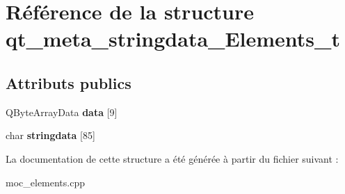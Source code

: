 \hypertarget{structqt__meta__stringdata__Elements__t}{\section{Référence de la structure qt\+\_\+meta\+\_\+stringdata\+\_\+\+Elements\+\_\+t}
\label{structqt__meta__stringdata__Elements__t}
}
\subsection*{Attributs publics}
\begin{DoxyCompactItemize}
\item 
\hypertarget{structqt__meta__stringdata__Elements__t_a9a53c432f6a13d562e493594fa17e253}{Q\+Byte\+Array\+Data {\bfseries data} \mbox{[}9\mbox{]}}\label{structqt__meta__stringdata__Elements__t_a9a53c432f6a13d562e493594fa17e253}

\item 
\hypertarget{structqt__meta__stringdata__Elements__t_aa349dfd3eee0891efb26dcc8ee13772a}{char {\bfseries stringdata} \mbox{[}85\mbox{]}}\label{structqt__meta__stringdata__Elements__t_aa349dfd3eee0891efb26dcc8ee13772a}

\end{DoxyCompactItemize}


La documentation de cette structure a été générée à partir du fichier suivant \+:\begin{DoxyCompactItemize}
\item 
moc\+\_\+elements.\+cpp\end{DoxyCompactItemize}
